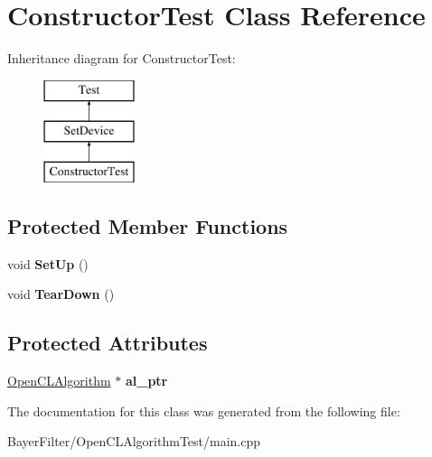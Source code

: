 \hypertarget{class_constructor_test}{\section{Constructor\-Test Class Reference}
\label{class_constructor_test}
}
Inheritance diagram for Constructor\-Test\-:\begin{figure}[H]
\begin{center}
\leavevmode
\includegraphics[height=3.000000cm]{class_constructor_test}
\end{center}
\end{figure}
\subsection*{Protected Member Functions}
\begin{DoxyCompactItemize}
\item 
\hypertarget{class_constructor_test_a5b0cfda3e3be2386ac215d2dcd6f5d41}{void {\bfseries Set\-Up} ()}\label{class_constructor_test_a5b0cfda3e3be2386ac215d2dcd6f5d41}

\item 
\hypertarget{class_constructor_test_a64eb912da38fc87e609976c0258bcc5e}{void {\bfseries Tear\-Down} ()}\label{class_constructor_test_a64eb912da38fc87e609976c0258bcc5e}

\end{DoxyCompactItemize}
\subsection*{Protected Attributes}
\begin{DoxyCompactItemize}
\item 
\hypertarget{class_constructor_test_a52d06dac53733af511d4331f02bc0c8a}{\hyperlink{class_open_c_l_algorithm}{Open\-C\-L\-Algorithm} $\ast$ {\bfseries al\-\_\-ptr}}\label{class_constructor_test_a52d06dac53733af511d4331f02bc0c8a}

\end{DoxyCompactItemize}


The documentation for this class was generated from the following file\-:\begin{DoxyCompactItemize}
\item 
Bayer\-Filter/\-Open\-C\-L\-Algorithm\-Test/main.\-cpp\end{DoxyCompactItemize}
